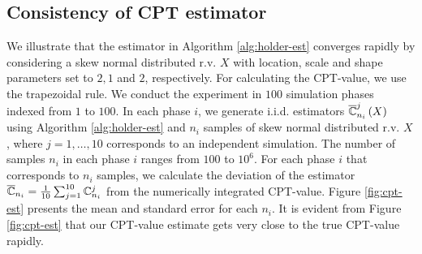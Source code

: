 \subsection{Consistency of CPT estimator}
We illustrate that the estimator in Algorithm \ref{alg:holder-est} converges rapidly by considering a skew normal distributed  r.v. $X$ with location, scale and shape parameters set to $2,1$ and $2$, respectively. For calculating the CPT-value, we use the trapezoidal rule. 
We conduct the experiment in $100$ simulation phases indexed from $1$ to $100$. In each phase $i$, we generate i.i.d. estimators $\overline{\mathbb{C}}^j_{n_i}\left(X\right)$ using Algorithm \ref{alg:holder-est} and $n_i$ samples of skew normal distributed r.v. $X$, where $j=1,\ldots,10$ corresponds to an independent simulation. The number of samples $n_i$ in each phase $i$ ranges from $100$ to $10^6$. For each phase $i$ that corresponds to $n_i$ samples, we calculate the deviation of the estimator $\overline {\mathbb{C}}_{n_i} = \frac1{10}\sum_{j=1}^{10}\mathbb{C}^j_{n_i}$ from the numerically integrated CPT-value. Figure \ref{fig:cpt-est} presents the mean and standard error for each $n_i$. 
It is evident from Figure \ref{fig:cpt-est} that our CPT-value estimate gets very close to the true CPT-value rapidly.

\newcommand{\errorband}[5][]{ %
\pgfplotstableread[col sep=tab, skip first n=2]{#2}\datatable

    \addplot [draw=none, fill=gray!40, stack plots=y, area legend, #1] table [
        x={#3},
        y expr=4*\thisrow{#5}
    ] {\datatable} \closedcycle;

    \addplot [forget plot, stack plots=y,draw=none] table [x={#3}, y expr=-(\thisrow{#4}+2*\thisrow{#5})] {\datatable};
}

